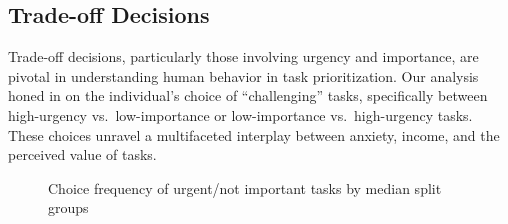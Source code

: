 \documentclass[
]{report}
\begin{document}
\begin{table}
\begin{minipage}[t]{\linewidth}
{\begin{center}
\label{table:coefficients}
\end{center}

}

\end{minipage}%

\end{table}

\hypertarget{trade-off-decisions}{%
\subsection{Trade-off Decisions}\label{trade-off-decisions}}

Trade-off decisions, particularly those involving urgency and
importance, are pivotal in understanding human behavior in task
prioritization. Our analysis honed in on the individual's choice of
``challenging'' tasks, specifically between high-urgency
vs.~low-importance or low-importance vs.~high-urgency tasks. These
choices unravel a multifaceted interplay between anxiety, income, and
the perceived value of tasks.

\begin{figure}

\begin{minipage}[t]{0.50\linewidth}

{\centering 


}

\end{minipage}%
%
\begin{minipage}[t]{0.50\linewidth}

{\centering 


}

\end{minipage}%

\caption{\label{fig-tradeoff-results}Choice frequency of urgent/not
important tasks by median split groups}

\end{figure}
\end{document}
